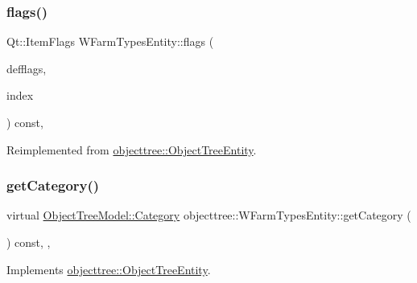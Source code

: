 \mbox{\label{classobjecttree_1_1_w_farm_types_entity_aa9328fe3b82e5c58eb36283051e06bff}} 
\subsubsection{\texorpdfstring{flags()}{flags()}}
{\footnotesize\ttfamily Qt\+::\+Item\+Flags W\+Farm\+Types\+Entity\+::flags (\begin{DoxyParamCaption}\item[{Qt\+::\+Item\+Flags}]{defflags,  }\item[{const Q\+Model\+Index \&}]{index }\end{DoxyParamCaption}) const\hspace{0.3cm}{\ttfamily [override]}, {\ttfamily [virtual]}}



Reimplemented from \mbox{\hyperlink{classobjecttree_1_1_object_tree_entity_a71042bfb5a8328bcbde9d283c0b1b28c}{objecttree\+::\+Object\+Tree\+Entity}}.

\mbox{\label{classobjecttree_1_1_w_farm_types_entity_af3e12199001b2f424c985aeea28a0fd8}} 
\subsubsection{\texorpdfstring{getCategory()}{getCategory()}}
{\footnotesize\ttfamily virtual \mbox{\hyperlink{class_object_tree_model_a379e9d6b0d381853785adf62095ba4e3}{Object\+Tree\+Model\+::\+Category}} objecttree\+::\+W\+Farm\+Types\+Entity\+::get\+Category (\begin{DoxyParamCaption}{ }\end{DoxyParamCaption}) const\hspace{0.3cm}{\ttfamily [inline]}, {\ttfamily [override]}, {\ttfamily [virtual]}}



Implements \mbox{\hyperlink{classobjecttree_1_1_object_tree_entity_aa4e80e7fa80672c1b9902add665abc77}{objecttree\+::\+Object\+Tree\+Entity}}.

